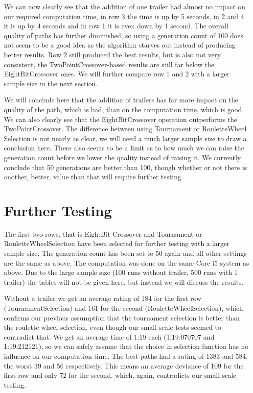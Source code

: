 We can now clearly see that the addition of one trailer had almost no impact on our required computation time, in row 3 the time is up by 5 seconds, in 2 and 4 it is up by 4 seconds and in row 1 it is even down by 1 second. The overall quality of paths has further diminished, so using a generation count of 100 does not seem to be a good idea as the algorithm starves out instead of producing better results. Row 2 still produced the best results, but is also not very consistent, the TwoPointCrossover-based results are still far below the EightBitCrossover ones. We will further compare row 1 and 2 with a larger sample size in the next section.

We will conclude here that the addition of trailers has far more impact on the quality of the path, which is bad, than on the computation time, which is good. We can also clearly see that the EightBitCrossover operation outperforms the TwoPointCrossover. The difference between using Tournament or RouletteWheel Selection is not nearly as clear, we will need a much larger sample size to draw a conclusion here. 
There also seems to be a limit as to how much we can raise the generation count before we lower the quality instead of raising it. We currently conclude that 50 generations are better than 100, though whether or not there is another, better, value than that will require further testing.

\section{Further Testing}
\label{sec:further_testing}

The first two rows, that is EightBit Crossover and Tournament or RouletteWheelSelection have been selected for further testing with a larger sample size. The generation count has been set to 50 again and all other settings are the same as above. The computation was done on the same Core i5 system as above. Due to the large sample size (100 runs without trailer, 500 runs with 1 trailer) the tables will not be given here, but instead we will discuss the results.

Without a trailer we get an average rating of 184 for the first row (TournamentSelection) and 161 for the second (RouletteWheelSelection), which confirms our previous assumption that the tournament selection is better than the roulette wheel selection, even though our small scale tests seemed to contradict that. We get an average time of 1:19 each (1:19:070707 and 1:19:212121), so we can safely assume that the choice in selection function has no influence on our computation time. The best paths had a rating of 1383 and 584, the worst 39 and 56 respectively. This means an average deviance of 109 for the first row and only 72 for the second, which, again, contradicts our small scale testing.


